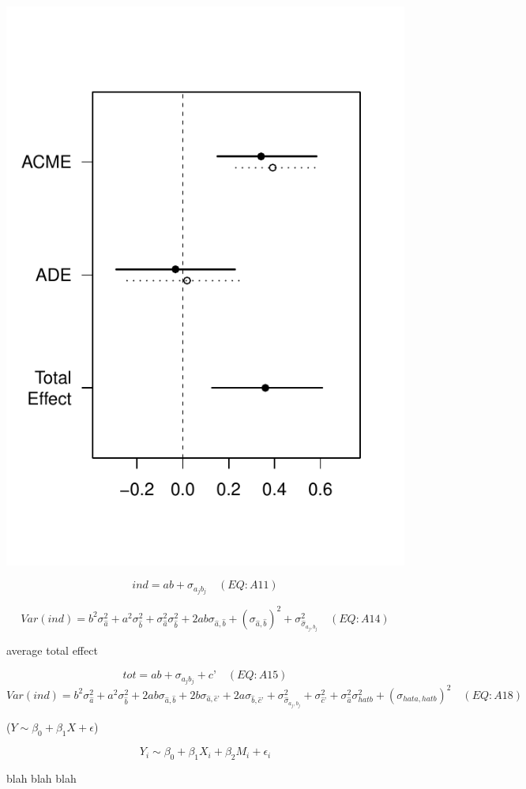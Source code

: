 \documentclass[12pt]{report}
\begin{document}
\includegraphics{../images/mediationPT_plot.pdf}

$$ ind = ab + \sigma_{a_{j}b_{j}} \quad (EQ:A11)$$

$$Var(ind) = b^{2} \sigma^{2}_{\hat{a}} + a^{2} \sigma^{2}_{\hat{b}} + \sigma^{2}_{\hat{a}}\sigma^{2}_{\hat{b}} + 2ab\sigma_{\hat{a},\hat{b}} + (\sigma_{\hat{a},\hat{b}})^2 + \sigma^{2}_{\hat{\sigma}_{a_{j},b_{j}}} \quad (EQ:A14) $$

average total effect

$$ tot = ab + \sigma_{a_{j}b_{j}} + c’ \quad (EQ:A15) $$ $$ Var(ind) = b^{2}\sigma^{2}_{\hat{a}} + a^{2}\sigma^{2}_{\hat{b}} + 2ab\sigma_{\hat{a},\hat{b}} + 2b\sigma_{\hat{a},\hat{c}’} + 2a\sigma_{\hat{b},\hat{c}’} + \sigma^{2}_{\hat{\sigma}_{a_{j},b_{j}}} + \sigma^{2}_{\hat{c}’} + \sigma^{2}_{\hat{a}}\sigma^{2}_{hat{b}} + (\sigma_{hat{a},hat{b}})^2 \quad (EQ:A18) $$


($Y \sim \beta_0 + \beta_1X + \epsilon$)

\begin{equation*}
  Y_i \sim \beta_0 + \beta_1X_i + \beta_2 M_i + \epsilon_i
\end{equation*}

blah blah blah\citep{Keller2014}

\printbibliography
\end{document}
